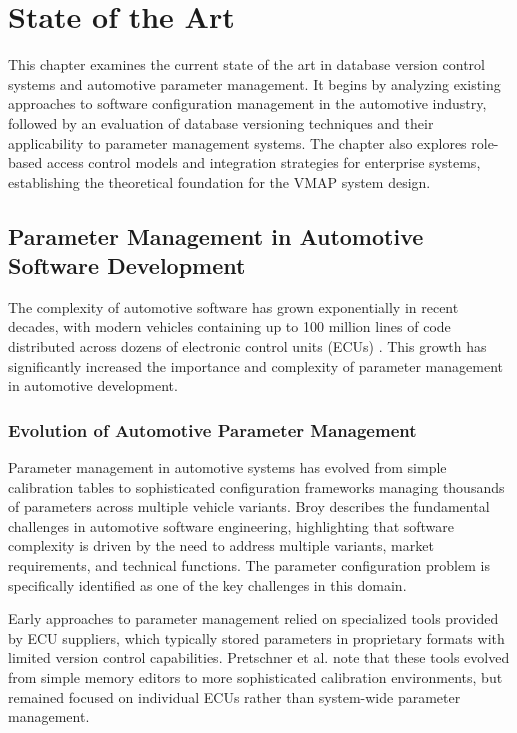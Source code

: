 \chapter{State of the Art}
\label{chap:state-of-art}

This chapter examines the current state of the art in database version control systems and automotive parameter management. It begins by analyzing existing approaches to software configuration management in the automotive industry, followed by an evaluation of database versioning techniques and their applicability to parameter management systems. The chapter also explores role-based access control models and integration strategies for enterprise systems, establishing the theoretical foundation for the VMAP system design.

\section{Parameter Management in Automotive Software Development}
\label{sec:parameter-management}

The complexity of automotive software has grown exponentially in recent decades, with modern vehicles containing up to 100 million lines of code distributed across dozens of electronic control units (ECUs) \cite{pretschner2007software}. This growth has significantly increased the importance and complexity of parameter management in automotive development.

\subsection{Evolution of Automotive Parameter Management}
\label{subsec:evolution-parameter-management}

Parameter management in automotive systems has evolved from simple calibration tables to sophisticated configuration frameworks managing thousands of parameters across multiple vehicle variants. Broy \cite{broy2006challenges} describes the fundamental challenges in automotive software engineering, highlighting that software complexity is driven by the need to address multiple variants, market requirements, and technical functions. The parameter configuration problem is specifically identified as one of the key challenges in this domain.

Early approaches to parameter management relied on specialized tools provided by ECU suppliers, which typically stored parameters in proprietary formats with limited version control capabilities. Pretschner et al. \cite{pretschner2007software} note that these tools evolved from simple memory editors to more sophisticated calibration environments, but remained focused on individual ECUs rather than system-wide parameter management.

